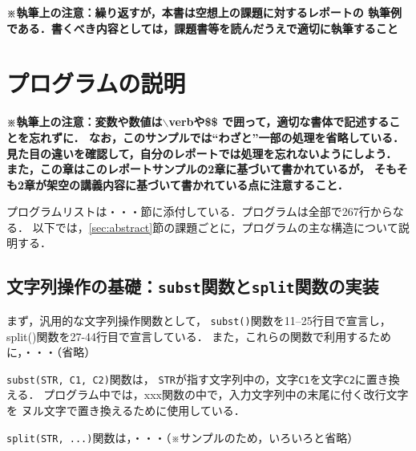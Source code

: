 \textbf{\small※執筆上の注意：繰り返すが，本書は空想上の課題に対するレポートの
    執筆例である．書くべき内容としては，課題書等を読んだうえで適切に執筆すること\\}


\section{プログラムの説明}
\textbf{\small ※執筆上の注意：変数や数値は$\backslash$verbや\$\$
    で囲って，適切な書体で記述することを忘れずに．
    なお，このサンプルでは``わざと''一部の処理を省略している．
    見た目の違いを確認して，自分のレポートでは処理を忘れないようにしよう．
    また，この章はこのレポートサンプルの2章に基づいて書かれているが，
    そもそも2章が架空の講義内容に基づいて書かれている点に注意すること．\\}

プログラムリストは・・・節に添付している．プログラムは全部で267行からなる．
以下では，\ref{sec:abstract}節の課題ごとに，プログラムの主な構造について説明する．

\subsection{文字列操作の基礎：\texttt{subst}関数と\texttt{split}関数の実装}

まず，汎用的な文字列操作関数として，
\verb|subst()|関数を11--25行目で宣言し， %
split()関数を27-44行目で宣言している．   %
また，これらの関数で利用するために，・・・（省略）

\verb|subst(STR, C1, C2)|関数は，
\verb|STR|が指す文字列中の，文字\verb|C1|を文字\verb|C2|に置き換える．
プログラム中では，xxx関数の中で，入力文字列中の末尾に付く改行文字を
ヌル文字で置き換えるために使用している．

\verb|split(STR, ...)|関数は，・・・（※サンプルのため，いろいろと省略）

